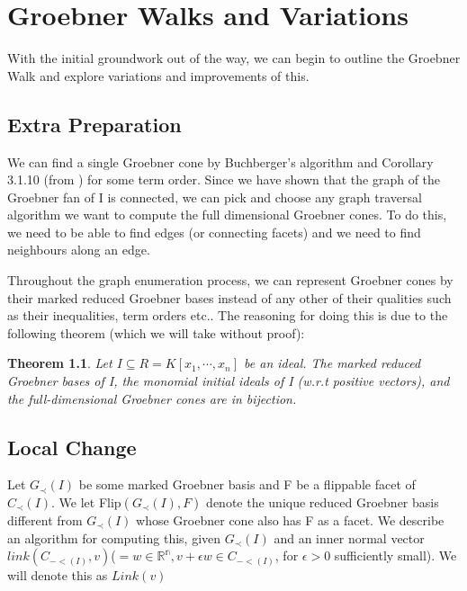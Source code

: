 \documentclass[12pt,a4paper]{report}
\newtheorem{theorem}{Theorem}
\begin{document}

\chapter{Groebner Walks and Variations}
With the initial groundwork out of the way, we can begin to outline the Groebner Walk and explore variations and improvements of this. 

\section{Extra Preparation}
We can find a single Groebner cone by Buchberger's algorithm and Corollary 3.1.10 (from \cite{AndersPHD}) for some term order. Since we have shown that the graph of the Groebner fan of I is connected, we can pick and choose any graph traversal algorithm we want to compute the full dimensional Groebner cones. To do this, we need to be able to find edges (or connecting facets) and we need to find neighbours along an edge.

Throughout the graph enumeration process, we can represent Groebner cones by their marked reduced Groebner bases instead of any other of their qualities such as their inequalities, term orders etc.. The reasoning for doing this is due to the following theorem (which we will take without proof):

\begin{theorem}
Let $I \subseteq R = K[x_{1}, \cdots, x_{n}]$ be an ideal. The marked reduced Groebner bases of I, the monomial initial ideals of I (w.r.t positive vectors), and the full-dimensional Groebner cones are in bijection.
\end{theorem}

\section{Local Change}
Let $G_{\prec} (I)$ be some marked Groebner basis and F be a flippable facet of $C_{\prec} (I)$. We let Flip$(G_{\prec} (I), F)$ denote the unique reduced Groebner basis different from $G_{\prec} (I)$ whose Groebner cone also has F as a facet. We describe an algorithm for computing this, given $G_{\prec} (I)$ and an inner normal vector $link(C_{-< (I)}, v) $($ = w \in \mathbb{R^n}, v + \epsilon w \in C_{-< (I)}$, for $\epsilon > 0$ sufficiently small). We will denote this as $Link(v)$
\end{document}
